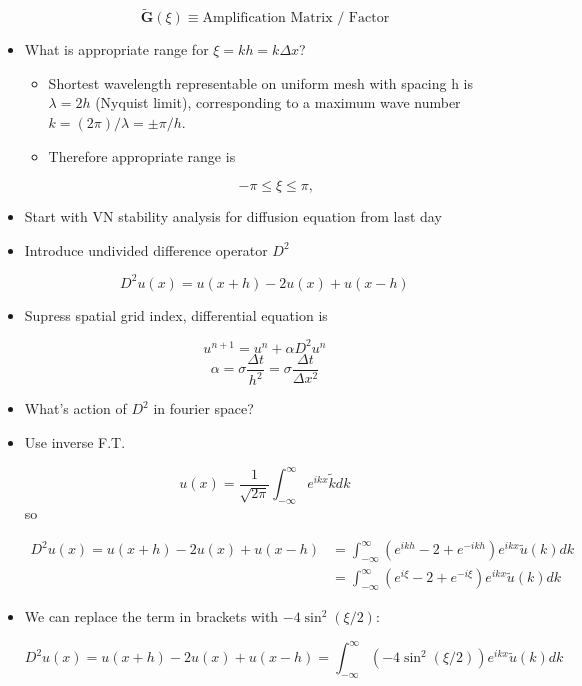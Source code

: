 \begin{itemize}
    \[\tilde{\mathbf{G}}(\xi) \equiv \text{Amplification Matrix / Factor}\]

    \item What is appropriate range for $\xi = kh = k \Delta x$?

    \begin{itemize}
        \item Shortest wavelength representable on uniform mesh with spacing h is $\lambda=2h$ (Nyquist limit), corresponding to a maximum wave number $k = (2\pi )/\lambda = \pm \pi /h$.

        \item Therefore appropriate range is 

        \[ -\pi \le \xi \le \pi, \]
    \end{itemize}
    
    \item Start with VN stability analysis for diffusion equation from last day

    \item Introduce undivided difference operator $D^2$

    \[ D^2 u(x) = u(x+h) - 2u(x) + u(x-h)\]

    \item Supress spatial grid index, differential equation is 

    \[ u^{n+1} = u^n + \alpha D^2 u^n\]
    \[ \alpha = \sigma \frac{\Delta t}{h^2} = \sigma \frac{\Delta t}{\Delta x^2}\]

    \item What's action of $D^2$ in fourier space?

    \item Use inverse F.T.

    \[ u(x) = \frac{1}{\sqrt{2 \pi}} \int_{-\infty}^{\infty} e^{ikx}\tilde{k}dk\]
    so 

    \begin{align}
        D^2 u(x) = u(x + h) - 2u(x) + u(x - h) &= \int_{-\infty}^{\infty} (e^{ikh} - 2 + e^{-ikh})e^{ikx}\tilde{u}(k)dk\\
        &= \int_{-\infty}^{\infty} (e^{i \xi} - 2 + e^{-i\xi}) e^{ikx}\tilde{u}(k)dk
    \end{align}

    \item We can replace the term in brackets with $-4\sin^2(\xi/2)$:

    \[ D^2 u(x) = u(x + h) - 2u(x) + u(x - h) = \int_{-\infty}^{\infty} \left(-4\sin^2(\xi/2)\right)e^{ikx}\tilde{u}(k)dk\]


\end{itemize}
